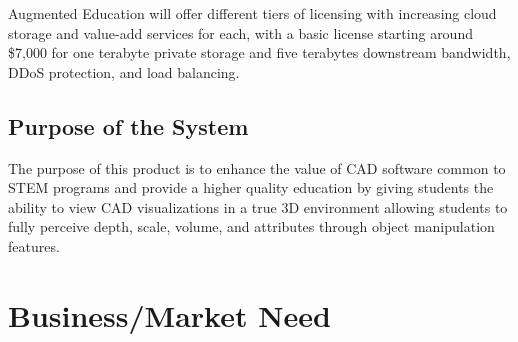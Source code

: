 Augmented Education will offer different tiers of licensing with increasing cloud storage and value-add services for each, with a basic license starting around \$7,000 for one terabyte private storage and five terabytes downstream bandwidth, DDoS protection, and load balancing. 


\subsection{Purpose of the System}

The purpose of this product is to enhance the value of CAD software common to STEM programs and provide a higher quality education by giving students the ability to view CAD visualizations in a true 3D environment allowing students to fully perceive depth, scale, volume, and attributes through object manipulation features.


\section{Business/Market Need}






